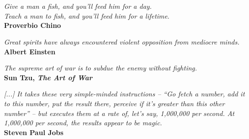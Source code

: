 \section*{}

\begin{flushright}
\textit{Give a man a fish, and you'll feed him for a day.\\
Teach a man to fish, and you'll feed him for a lifetime}.\\
\textbf{Proverbio Chino}

\vspace{0.5cm}

\textit{Great spirits have always encountered violent opposition from mediocre minds.}\\
\textbf{Albert Einsten}

\vspace{0.5cm}

\textit{The supreme art of war is to subdue the enemy without fighting.}\\
\textbf{Sun Tzu, \emph{The Art of War}}

\vspace{0.5cm}

\textit{[...] It takes these very simple-minded instructions -- ``Go fetch a number, add it to this number, put the result there, perceive if it's greater than this other number'' -- but executes them at a rate of, let's say, 1,000,000 per second. At 1,000,000 per second, the results appear to be magic.}\\
\textbf{Steven Paul Jobs}
\end{flushright}
